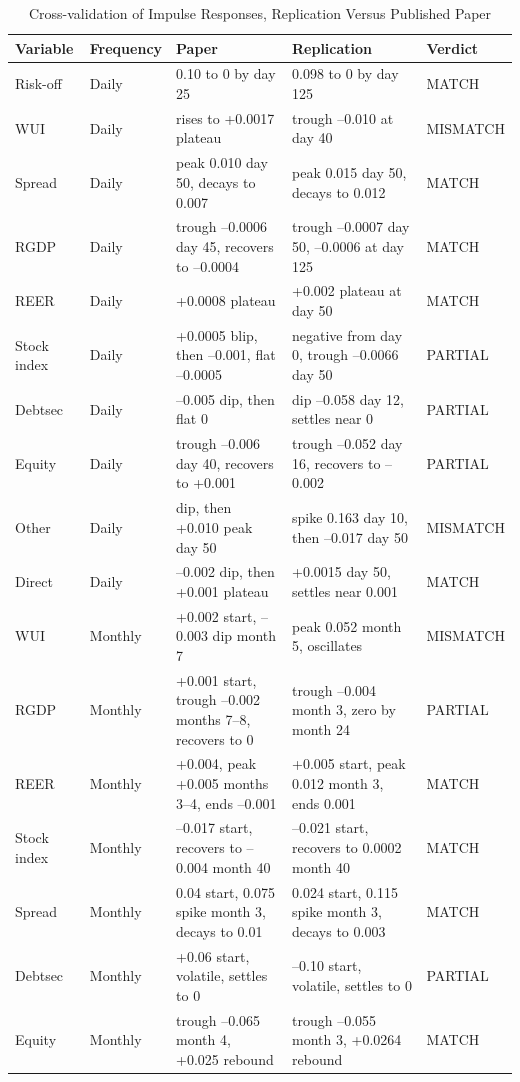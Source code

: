\FloatBarrier
\begin{table}[H]
  \centering
  \caption{Cross-validation of Impulse Responses, Replication Versus Published Paper}
  \label{tab:crossval}
  \small
  \begin{tabularx}{\textwidth}{@{}l l p{4.6cm} p{4.6cm} l@{}}
    \toprule
    Variable & Frequency & Paper & Replication & Verdict \\
    \midrule
    Risk-off & Daily & 0.10 to 0 by day 25 & 0.098 to 0 by day 125 & MATCH \\
    WUI & Daily & rises to +0.0017 plateau & trough --0.010 at day 40 & MISMATCH \\
    Spread & Daily & peak 0.010 day 50, decays to 0.007 & peak 0.015 day 50, decays to 0.012 & MATCH \\
    RGDP & Daily & trough --0.0006 day 45, recovers to --0.0004 & trough --0.0007 day 50, --0.0006 at day 125 & MATCH \\
    REER & Daily & +0.0008 plateau & +0.002 plateau at day 50 & MATCH \\
    Stock index & Daily & +0.0005 blip, then --0.001, flat --0.0005 & negative from day 0, trough --0.0066 day 50 & PARTIAL \\
    Debtsec & Daily & --0.005 dip, then flat 0 & dip --0.058 day 12, settles near 0 & PARTIAL \\
    Equity & Daily & trough --0.006 day 40, recovers to +0.001 & trough --0.052 day 16, recovers to --0.002 & PARTIAL \\
    Other & Daily & dip, then +0.010 peak day 50 & spike 0.163 day 10, then --0.017 day 50 & MISMATCH \\
    Direct & Daily & --0.002 dip, then +0.001 plateau & +0.0015 day 50, settles near 0.001 & MATCH \\
    WUI & Monthly & +0.002 start, --0.003 dip month 7 & peak 0.052 month 5, oscillates & MISMATCH \\
    RGDP & Monthly & +0.001 start, trough --0.002 months 7--8, recovers to 0 & trough --0.004 month 3, zero by month 24 & PARTIAL \\
    REER & Monthly & +0.004, peak +0.005 months 3--4, ends --0.001 & +0.005 start, peak 0.012 month 3, ends 0.001 & MATCH \\
    Stock index & Monthly & --0.017 start, recovers to --0.004 month 40 & --0.021 start, recovers to 0.0002 month 40 & MATCH \\
    Spread & Monthly & 0.04 start, 0.075 spike month 3, decays to 0.01 & 0.024 start, 0.115 spike month 3, decays to 0.003 & MATCH \\
    Debtsec & Monthly & +0.06 start, volatile, settles to 0 & --0.10 start, volatile, settles to 0 & PARTIAL \\
    Equity & Monthly & trough --0.065 month 4, +0.025 rebound & trough --0.055 month 3, +0.0264 rebound & MATCH \\
    \bottomrule
  \end{tabularx}
\end{table}
\FloatBarrier

